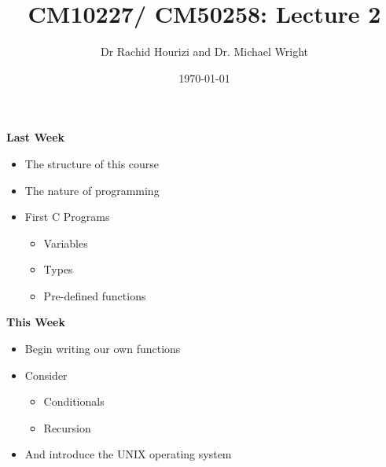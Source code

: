 \documentclass{beamer}
\begin{document}

\title{CM10227/ CM50258: Lecture 2}
\author{Dr Rachid Hourizi and Dr. Michael Wright}
\date{\today}
\frame{\titlepage}

\begin{frame}
 
\textbf{Last Week}
 

\begin{itemize}
\item The structure of this course
\item The nature of programming
\item First C Programs

\begin{itemize}
\item Variables
\item Types
\item Pre-defined functions
\end{itemize}
\end{itemize}
\end{frame}

\begin{frame}
 
\textbf{This Week}
 

\begin{itemize}
\item Begin writing our own functions
\item Consider
\begin{itemize}
\item Conditionals
\item Recursion
\end{itemize}
\item And introduce the UNIX operating system
\end{itemize}
\end{frame}
\end{document}
